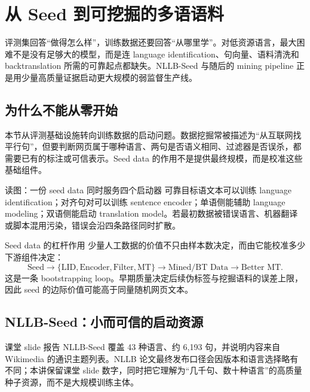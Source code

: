 \section{从 Seed 到可挖掘的多语语料}

评测集回答“做得怎么样”，训练数据还要回答“从哪里学”。对低资源语言，最大困难不是没有足够大的模型，而是连 language identification、句向量、语料清洗和 backtranslation 所需的可靠起点都缺失。NLLB-Seed 与随后的 mining pipeline 正是用少量高质量证据启动更大规模的弱监督生产线。

\subsection{为什么不能从零开始}

本节从评测基础设施转向训练数据的启动问题。数据挖掘常被描述为“从互联网找平行句”，但要判断网页属于哪种语言、两句是否语义相同、过滤器是否误杀，都需要已有的标注或可信表示。Seed data 的作用不是提供最终规模，而是校准这些基础组件。


\begin{knowledgebox}{读图：一份 seed data 同时服务四个启动器}
可靠目标语文本可以训练 language identification；对齐句对可以训练 sentence encoder；单语侧能辅助 language modeling；双语侧能启动 translation model。若最初数据被错误语言、机器翻译或脚本混用污染，错误会沿四条路径同时扩散。
\end{knowledgebox}

\begin{importantbox}{Seed data 的杠杆作用}
少量人工数据的价值不只由样本数决定，而由它能校准多少下游组件决定：
\[
\text{Seed}\rightarrow\{\text{LID},\text{Encoder},\text{Filter},\text{MT}\}
\rightarrow\text{Mined/BT Data}\rightarrow\text{Better MT}.
\]
这是一条 bootstrapping loop。早期质量决定后续伪标签与挖掘语料的误差上限，因此 seed 的边际价值可能高于同量随机网页文本。
\end{importantbox}

\subsection{NLLB-Seed：小而可信的启动资源}

课堂 slide 报告 NLLB-Seed 覆盖 43 种语言、约 6,193 句，并说明内容来自 Wikimedia 的通识主题列表。NLLB 论文最终发布口径会因版本和语言选择略有不同；本讲保留课堂 slide 数字，同时把它理解为“几千句、数十种语言”的高质量种子资源，而不是大规模训练主体。

